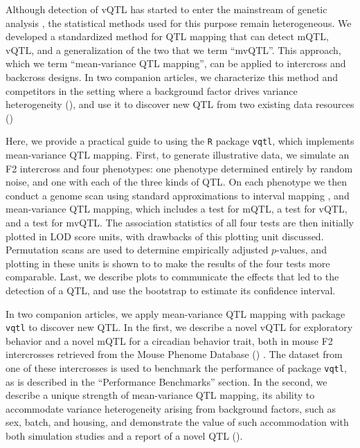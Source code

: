 Although detection of vQTL has started to enter the mainstream of genetic analysis \citep{Yang2012,Hulse2013,Ayroles2015,Wei2016-lt,Wang2017,Wei2017-tt}, the statistical methods used for this purpose remain heterogeneous.
We developed a standardized method for QTL mapping that can detect mQTL, vQTL, and a generalization of the two that we term ``mvQTL''.
This approach, which we term ``mean-variance QTL mapping'', can be applied to intercross and backcross designs.
In two companion articles, we characterize this method and competitors in the setting where a background factor drives variance heterogeneity (\CortyMethodsPaper), and use it to discover new QTL from two existing data resources (\CortyReanalysisPaper)

Here, we provide a practical guide to using the \texttt{R} package \texttt{vqtl}, which implements mean-variance QTL mapping.
First, to generate illustrative data, we simulate an F2 intercross and four phenotypes: one phenotype determined entirely by random noise, and one with each of the three kinds of QTL.
On each phenotype we then conduct a genome scan using standard approximations to interval mapping \citep{Lander1989a,Martinez1992}, and mean-variance QTL mapping, which includes a test for mQTL, a test for vQTL, and a test for mvQTL.
The association statistics of all four tests are then initially plotted in LOD score units, with drawbacks of this plotting unit discussed.
Permutation scans are used to determine empirically adjusted $p$-values, and plotting in these units is shown to to make the results of the four tests more comparable.
Last, we describe plots to communicate the effects that led to the detection of a QTL, and use the bootstrap to estimate its confidence interval.

In two companion articles, we apply mean-variance QTL mapping with package \texttt{vqtl} to discover new QTL.
In the first, we describe a novel vQTL for exploratory behavior and a novel mQTL for a circadian behavior trait, both in mouse F2 intercrosses retrieved from the Mouse Phenome Database (\CortyReanalysisPaper) \citep{Bogue2015}.
The dataset from one of these intercrosses is used to benchmark the performance of package \texttt{vqtl}, as is described in the ``Performance Benchmarks'' section.
In the second, we describe a unique strength of mean-variance QTL mapping, its ability to accommodate variance heterogeneity arising from background factors, such as sex, batch, and housing, and demonstrate the value of such accommodation with both simulation studies and a report of a novel QTL (\CortyMethodsPaper).